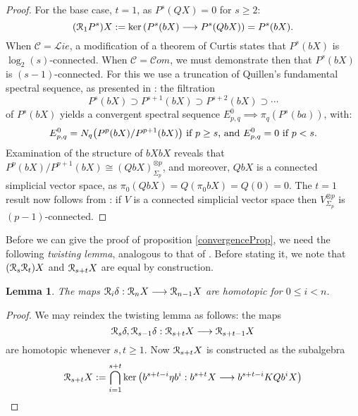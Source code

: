 \documentclass[11pt]{amsart}
\theoremstyle{plain}
\newtheorem{lem}[thm]{Lemma}
\theoremstyle{definition}
\renewcommand{\ker}{\textup{ker}\,}
\renewcommand{\to}{\longrightarrow}
\newcommand{\scrL}{\mathscr{L}}
\newcommand{\scrC}{\mathscr{C}}
\newcommand{\calR}{\mathcal{R}}
\newcommand{\calC}{\mathcal{C}}
\theoremstyle{plain}
\newcommand{\algs}{{\scrC\!\textit{om}}}
\newcommand{\liealgs}{{\scrL\!\textit{ie}}}
\newcommand{\algcat}{{\calC}}%
\newcommand{\caldup}[1]{\calR_{\smash{#1}}}
\newcommand{\barConstructionMightAbbreviate}{b}
\begin{document}
\begin{BK spec seq}
\begin{connectivity}
\begin{proof}
For the base case, $t=1$, as $P^s(QX)=0$ for $s\geq2$:
\[(\caldup{1}P^{s})X:=\ker(P^{s}(\barConstructionMightAbbreviate X)\to P^{s}(Q\barConstructionMightAbbreviate X))=P^{s}(\barConstructionMightAbbreviate X).\]
When $\algcat=\liealgs$, a modification \cite[4.3]{6Author.pdf} of a theorem of Curtis \cite[\S5]{Curtis_LCS.pdf} states that $P^{s}(\barConstructionMightAbbreviate X)$ is $\log_2(s)$-connected.
When $\algcat=\algs$, we must demonstrate then that $P^s(\barConstructionMightAbbreviate X)$ is $(s-1)$-connected. For this
 we use a truncation of Quillen's fundamental spectral sequence, as presented in \cite[Thm 6.2]{MR1089001}: the filtration
\[P^s(\barConstructionMightAbbreviate X)\supset P^{s+1}(\barConstructionMightAbbreviate X)\supset P^{s+2}(\barConstructionMightAbbreviate X)\supset\cdots \]
of $P^s(\barConstructionMightAbbreviate X)$ yields a convergent spectral sequence  $E^0_{p,q}\implies \pi_q(P^s(\barConstructionMightAbbreviate a))$, with:
\[E^0_{p,q}=N_q\bigl(P^{p}(\barConstructionMightAbbreviate X)/P^{p+1}(\barConstructionMightAbbreviate X)\bigr)\textup{ if $p\geq s$, and }E^0_{p,q}=0\textup{ if $p<s$.}\]
Examination of the structure of $\barConstructionMightAbbreviate X\barConstructionMightAbbreviate X$ reveals that $P^{p}(\barConstructionMightAbbreviate X)/P^{p+1}(\barConstructionMightAbbreviate X)\cong (Q\barConstructionMightAbbreviate X)^{\otimes p}_{\Sigma_p}$, and moreover, $Q\barConstructionMightAbbreviate X$ is a connected simplicial vector space, as $\pi_0(Q\barConstructionMightAbbreviate X)=Q(\pi_0\barConstructionMightAbbreviate X)=Q(0)=0$. The $t=1$ result now follows from \cite[Satz 12.1]{DoldPuppeSuspension.pdf}: if $V$ is a connected simplicial vector space then $V^{\otimes p}_{\Sigma_p}$ is $(p-1)$-connected. 
\end{proof}
Before we can give the proof of proposition \ref{convergenceProp}, we need the following \emph{twisting lemma}, analogous to that of \cite{BK_pairings.pdf}. Before stating it, we note that $(\caldup{s}\caldup{t})X$ and $\caldup{s+t}X$ are equal by construction.
\begin{lem}
\label{DsDt=Dt+s}
The maps $\caldup{i}\delta:\caldup{n}X\to \caldup{n-1}X$ are homotopic for $0\leq i< n$.
\end{lem}
\begin{proof}
We may reindex the twisting lemma as follows: the maps 
\[\caldup{s}\delta,\caldup{s-1}\delta:\caldup{s+t}X\to \caldup{s+t-1}X\]
are homotopic whenever $s,t\geq1$. Now $\caldup{s+t}X$ is constructed as the subalgebra
\[\caldup{s+t}X:= \bigcap_{i=1}^{s+t}\ker\!\left(\barConstructionMightAbbreviate^{s+t-i}\eta \barConstructionMightAbbreviate^{i}:\barConstructionMightAbbreviate^{s+t}X\to \barConstructionMightAbbreviate^{s+t-i}KQ\barConstructionMightAbbreviate^{i}X\right)\]

\end{proof}
\end{connectivity}
\end{BK spec seq}
\end{document}
